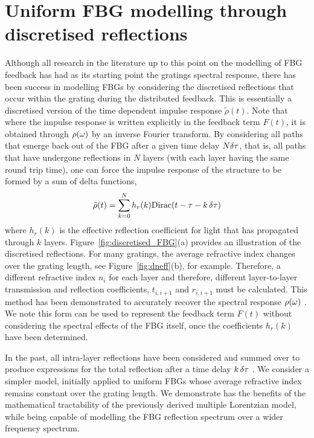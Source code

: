 \section{Uniform FBG modelling through discretised reflections}
\label{sec:FBG_discretised}
%
%
Although all research in the literature up to this point on the modelling of FBG feedback has had as its starting point the gratings spectral response, 
there has been success in modelling FBGs by considering the discretised reflections that occur within the grating during the distributed feedback. 
This is essentially a discretised version of the time dependent impulse response $\tilde{\rho}(t)$. 
Note that where the impulse response is written explicitly in the feedback term $F(t)$, it is obtained through $\rho(\omega)$ by an inverse Fourier transform. 
By considering all paths that emerge back out of the FBG after a given time delay $N \delta \tau$, that is, all paths that have undergone reflections in $N$ layers (with each layer having the same round trip time), 
one can force the impulse response of the structure to be formed by a sum of delta functions,
%
\begin{equation}
    \tilde{\rho}(t) = \sum_{k=0}^N h_r(k) \text{Dirac}(t-\tau-k\, \delta \tau)
\end{equation}
%
where $h_r(k)$ is the effective reflection coefficient for light that has propagated through $k$ layers. 
Figure~\ref{fig:discretised_FBG}(a) provides an illustration of the discretised reflections. 
For many gratings, the average refractive index changes over the grating length, see Figure~\ref{fig:dneff}(b), for example. 
Therefore, a different refractive index $n_i$ for each layer and therefore, different layer-to-layer transmission and reflection coefficients, $t_{i,i+1}$ and $r_{i,i+1}$ must be calculated. 
This method has been demonstrated to accurately recover the spectral response $\rho(\omega)$ \cite{capmany2007synthesis}. 
We note this form can be used to represent the feedback term $F(t)$ without considering the spectral effects of the FBG itself, once the coefficients $h_r(k)$ have been determined.
%
\par
%
In the past, all intra-layer reflections have been considered and summed over to produce expressions for the total reflection after a time delay $k \, \delta \tau$ \cite{ghiringhelli2002time}. 
We consider a simpler model, initially applied to uniform FBGs whose average refractive index remains constant over the grating length. 
We demonstrate has the benefits of the mathematical tractability of the previously derived multiple Lorentzian model, while being capable of modelling the FBG reflection spectrum over a wider frequency spectrum. 
%
%
